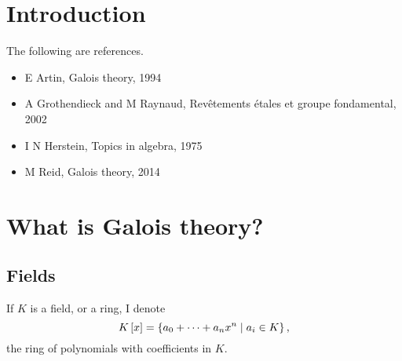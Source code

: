 \def\module{M3P11 Galois Theory}
\def\lecturer{Prof Alessio Corti}
\def\term{Spring 2019}

\def\thm{section}







\section{Introduction}


The following are references.
\begin{itemize}
\item E Artin, Galois theory, 1994
\item A Grothendieck and M Raynaud, Rev\^etements \'etales et groupe fondamental, 2002
\item I N Herstein, Topics in algebra, 1975
\item M Reid, Galois theory, 2014
\end{itemize}

\pagebreak

\section{What is Galois theory?}

\subsection{Fields}

\begin{notation1}
If $ K $ is a field, or a ring, I denote
$$ K\left[ x \right] = \left\{ a_0 + \dots + a_nx^n \mid a_i \in K \right\}, $$
the ring of polynomials with coefficients in $ K $.
\end{notation1}


